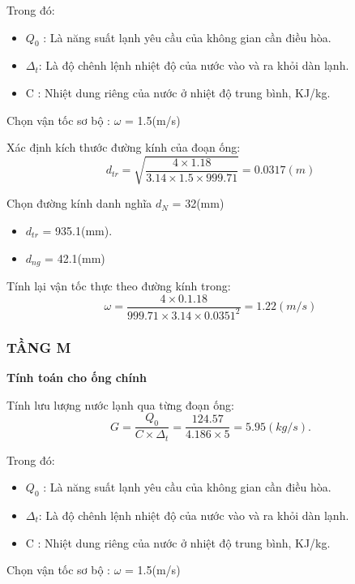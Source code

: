 Trong đó:
\begin{itemize}
	\item $Q_{0}$ : Là năng suất lạnh yêu cầu của không gian cần điều hòa.
	\item $\Delta_{t}$: Là độ chênh lệnh nhiệt độ của nước vào và ra khỏi dàn lạnh.
	\item C : Nhiệt dung riêng của nước ở nhiệt độ trung bình, KJ/kg.
\end{itemize}

Chọn vận tốc sơ bộ : $\omega$ = 1.5(m/s)

Xác định kích thước đường kính của đoạn ống:
\begin{equation*}
	d_{tr} = \sqrt{\dfrac{4 \times 1.18}{3.14 \times 1.5 \times 999.71}} = 0.0317(m)
\end{equation*}

Chọn đường kính danh nghĩa $d_{N}$ = 32(mm)
\begin{itemize}
	\item $d_{tr}$ = 935.1(mm).
	\item $d_{ng}$ = 42.1(mm)
\end{itemize}

Tính lại vận tốc thực theo đường kính trong:
\begin{equation*}
	\omega = \dfrac{4 \times 0.1.18 }{999.71 \times 3.14 \times 0.0351^{2}} = 1.22(m/s)
\end{equation*}

\subsubsection{TẦNG M}

\textbf{Tính toán cho ống chính}

Tính lưu lượng nước lạnh qua từng đoạn ống:
\begin{equation*}
	G = \dfrac{Q_{0}}{C \times \Delta_{t}} =\dfrac{124.57}{4.186 \times 5} = 5.95(kg/s).
\end{equation*}

Trong đó:
\begin{itemize}
	\item $Q_{0}$ : Là năng suất lạnh yêu cầu của không gian cần điều hòa.
	\item $\Delta_{t}$: Là độ chênh lệnh nhiệt độ của nước vào và ra khỏi dàn lạnh.
	\item C : Nhiệt dung riêng của nước ở nhiệt độ trung bình, KJ/kg.
\end{itemize}

Chọn vận tốc sơ bộ : $\omega$ = 1.5(m/s)

